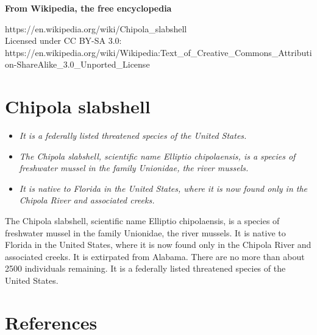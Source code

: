 \textbf{From Wikipedia, the free encyclopedia}

https://en.wikipedia.org/wiki/Chipola\_slabshell\\
Licensed under CC BY-SA 3.0:\\
https://en.wikipedia.org/wiki/Wikipedia:Text\_of\_Creative\_Commons\_Attribution-ShareAlike\_3.0\_Unported\_License

\section{Chipola slabshell}\label{chipola-slabshell}

\begin{itemize}
\item
  \emph{It is a federally listed threatened species of the United
  States.}
\item
  \emph{The Chipola slabshell, scientific name Elliptio chipolaensis, is
  a species of freshwater mussel in the family Unionidae, the river
  mussels.}
\item
  \emph{It is native to Florida in the United States, where it is now
  found only in the Chipola River and associated creeks.}
\end{itemize}

The Chipola slabshell, scientific name Elliptio chipolaensis, is a
species of freshwater mussel in the family Unionidae, the river mussels.
It is native to Florida in the United States, where it is now found only
in the Chipola River and associated creeks. It is extirpated from
Alabama. There are no more than about 2500 individuals remaining. It is
a federally listed threatened species of the United States.

\section{References}\label{references}
